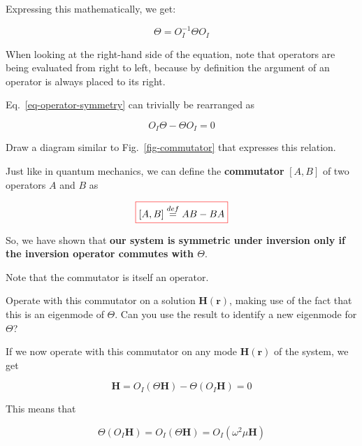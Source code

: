 Expressing this mathematically, we get:

\begin{equation}
  \Theta = O_I^{-1} \Theta O_I
  \label{eq-operator-symmetry}
\end{equation} 

When looking at the right-hand side of the equation, note that operators are being evaluated from right to left, because by definition the argument of an operator is always placed to its right.

Eq.~\ref{eq-operator-symmetry} can trivially be rearranged as

$$O_I \Theta - \Theta O_I = 0$$

\begin{exer}
Draw a diagram similar to Fig.~\ref{fig-commutator} that expresses this relation.
\end{exer}

\noindent{}Just like in quantum mechanics, we can define the \textbf{commutator} $[A,B]$ of two operators $A$ and $B$ as

\begin{equation}
 \fbox{$\displaystyle
   [A,B] \stackrel{def}{=} AB - BA
 $}
\end{equation} 

So, we have shown that \textbf{our system is symmetric under inversion only if the inversion operator commutes with $\Theta$}.

Note that the commutator is itself an operator. 

\begin{cue}
Operate with this commutator on a solution ${\mathbf H({\mathbf r})}$, making use of the fact that this is an eigenmode of $\Theta$. Can you use the result to identify a new eigenmode for $\Theta$? 
\end{cue}

If we now operate with this commutator on any mode ${\mathbf H({\mathbf r})}$ of the system, we get

\begin{equation}
[O_I, \Theta] {\mathbf H}= O_I \left(\Theta {\mathbf H} \right) - \Theta \left(O_I {\mathbf H} \right) = 0
\end{equation} 

This means that

\begin{equation}
\Theta \left(O_I {\mathbf H} \right) = O_I \left( \Theta {\mathbf H} \right) = O_I \left( \omega^2 \mu {\mathbf H}\right)
\end{equation} 

